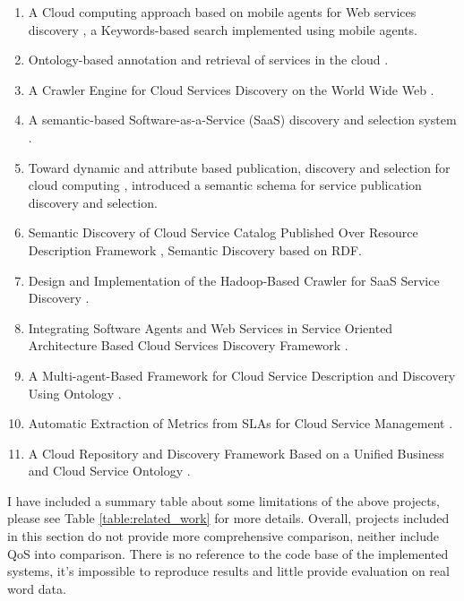 \begin{enumerate}
    \item 
    A Cloud computing approach based on mobile agents for Web services discovery
    \cite{MobileAgentsWebServicesDiscovery}, a Keywords-based search implemented using mobile agents.    
    \item
    Ontology-based annotation and retrieval of services in the cloud \cite{Ontology-basedAnnotationRetrievalOfServicesInCloud}.
    \item
    A Crawler Engine for Cloud Services Discovery on the World Wide Web \cite{CSCE}.
    \item
    A semantic-based Software-as-a-Service (SaaS) discovery and selection system \cite{SaaSdiscoverySelectionSystem}.
    \item
    Toward dynamic and attribute based publication, discovery and selection for cloud computing \cite{DynamicAttributeBasedPublicationDiscoverySelectionForCloud}, introduced a semantic schema for service publication discovery and selection.
    \item
    Semantic Discovery of Cloud Service Catalog Published Over Resource Description Framework \cite{Vasudevan2014SemanticDO}, Semantic Discovery based on RDF.
    \item
    Design and Implementation of the Hadoop-Based Crawler for SaaS Service Discovery \cite{Hadoop-BasedCrawlerForSaaSDiscovery}.
    \item
    Integrating Software Agents and Web Services in Service Oriented Architecture Based Cloud Services Discovery Framework \cite{AgentSOAServicesDiscovery}.
    \item
    A Multi-agent-Based Framework for Cloud Service Description and Discovery Using Ontology \cite{Multi-agent-BasedCloudDescriptionDiscoveryOntology}.
    \item
    Automatic Extraction of Metrics from SLAs for Cloud Service Management \cite{AutoExtractionSLA}.
    \item
	A Cloud Repository and Discovery Framework Based on a Unified Business and Cloud Service Ontology \cite{CloudRepositoryDiscoveryFrameworkBasedonOntology}.
\end{enumerate}

I have included a summary table about some limitations of the above projects, please see Table \ref{table:related_work} for more details. Overall, projects included in this section do not provide more comprehensive comparison, neither include QoS into comparison. There is no reference to the code base of the implemented systems, it's impossible to reproduce results and little provide evaluation on real word data.

